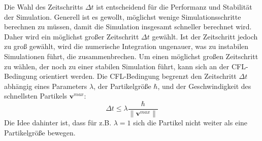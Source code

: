 \documentclass{scrreprt}
\begin{document}
Die Wahl des Zeitschritts $\Delta t$ ist entscheidend für die Performanz und Stabilität der Simulation.
Generell ist es gewollt, möglichst wenige Simulationsschritte berechnen zu müssen, damit die Simulation insgesamt schneller berechnet wird.
Daher wird ein möglichst großer Zeitschritt $\Delta t$ gewählt.
Ist der Zeitschritt jedoch zu groß gewählt, wird die numerische Integration ungenauer, was zu instabilen Simulationen führt, die zusammenbrechen.
Um einen möglichst großen Zeitschritt zu wählen, der noch zu einer stabilen Simulation führt, kann sich an der CFL-Bedingung orientiert werden.
Die CFL-Bedingung begrenzt den Zeitschritt $\Delta t$ abhängig eines Parameters $\lambda$, 
der Partikelgröße $\hbar$, und der Geschwindigkeit des schnellsten Partikels $\textbf{v}^{max}$:
\begin{equation}
    \Delta t \leq \lambda \frac{\hbar}{\|\textbf{v}^{max}\| }
\end{equation}
Die Idee dahinter ist, dass für z.B. $\lambda = 1$ sich die Partikel nicht weiter als eine Partikelgröße bewegen. \cite{koschier_smoothed_2020}
\end{document}
